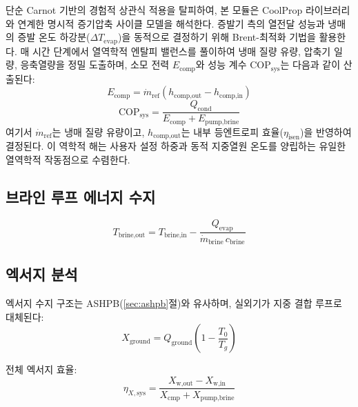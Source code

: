 단순 Carnot 기반의 경험적 상관식 적용을 탈피하여, 본 모듈은 CoolProp 라이브러리와 연계한 명시적 증기압축 사이클 모델을 해석한다. 증발기 측의 열전달 성능과 냉매의 증발 온도 하강분($\Delta T_{\text{evap}}$)을 동적으로 결정하기 위해 Brent-최적화 기법을 활용한다. 매 시간 단계에서 열역학적 엔탈피 밸런스를 풀이하여 냉매 질량 유량, 압축기 일량, 응축열량을 정밀 도출하며, 소모 전력 $E_{\text{comp}}$와 성능 계수 $\text{COP}_{\text{sys}}$는 다음과 같이 산출된다:
\begin{equation}\label{eq:gshp-w-comp}
  E_{\text{comp}} = \dot{m}_{\text{ref}} (h_{\text{comp,out}} - h_{\text{comp,in}})
\end{equation}
\begin{equation}\label{eq:gshp-COP}
  \text{COP}_\text{sys} = \frac{Q_\text{cond}}{E_{\text{comp}} + E_{\text{pump,brine}}}
\end{equation}
여기서 $\dot{m}_{\text{ref}}$는 냉매 질량 유량이고, $h_{\text{comp,out}}$는 내부 등엔트로피 효율($\eta_{\text{isen}}$)을 반영하여 결정된다. 이 역학적 해는 사용자 설정 하중과 동적 지중열원 온도를 양립하는 유일한 열역학적 작동점으로 수렴한다.

\subsection{브라인 루프 에너지 수지}

\begin{equation}\label{eq:gshp-brine}
  T_\text{brine,out} = T_\text{brine,in} - \frac{Q_\text{evap}}{\dot{m}_\text{brine}\,c_\text{brine}}
\end{equation}

\subsection{엑서지 분석}

엑서지 수지 구조는 ASHPB(\ref{sec:ashpb}절)와 유사하며, 실외기가 지중 결합 루프로 대체된다:
\begin{equation}\label{eq:gshp-Xground}
  X_\text{ground} = Q_\text{ground}\left(1 - \frac{T_0}{T_g}\right)
\end{equation}

전체 엑서지 효율:
\begin{equation}\label{eq:gshp-etaX}
  \eta_{X,\text{sys}} = \frac{X_\text{w,out} - X_\text{w,in}}{X_\text{cmp} + X_\text{pump,brine}}
\end{equation}

